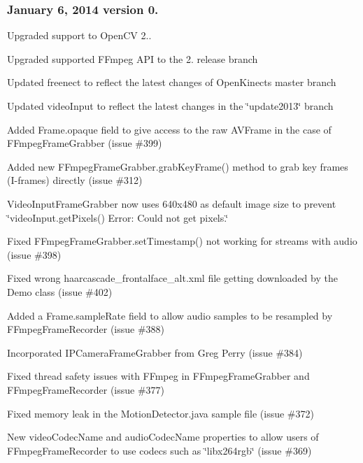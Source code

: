 \subsubsection*{January 6, 2014 version 0.}


\begin{DoxyItemize}
\item Upgraded support to Open\+C\+V 2..
\item Upgraded supported F\+Fmpeg A\+P\+I to the 2. release branch
\item Updated {\ttfamily freenect} to reflect the latest changes of Open\+Kinect\textquotesingle{}s master branch
\item Updated {\ttfamily video\+Input} to reflect the latest changes in the \char`\"{}update2013\char`\"{} branch
\item Added {\ttfamily Frame.\+opaque} field to give access to the raw {\ttfamily A\+V\+Frame} in the case of {\ttfamily F\+Fmpeg\+Frame\+Grabber} (issue \#399)
\item Added new {\ttfamily F\+Fmpeg\+Frame\+Grabber.\+grab\+Key\+Frame()} method to grab key frames (I-\/frames) directly (issue \#312)
\item {\ttfamily Video\+Input\+Frame\+Grabber} now uses 640x480 as default image size to prevent \char`\"{}video\+Input.\+get\+Pixels() Error\+: Could not get pixels.\char`\"{}
\item Fixed {\ttfamily F\+Fmpeg\+Frame\+Grabber.\+set\+Timestamp()} not working for streams with audio (issue \#398)
\item Fixed wrong {\ttfamily haarcascade\+\_\+frontalface\+\_\+alt.\+xml} file getting downloaded by the {\ttfamily Demo} class (issue \#402)
\item Added a {\ttfamily Frame.\+sample\+Rate} field to allow audio samples to be resampled by {\ttfamily F\+Fmpeg\+Frame\+Recorder} (issue \#388)
\item Incorporated {\ttfamily I\+P\+Camera\+Frame\+Grabber} from Greg Perry (issue \#384)
\item Fixed thread safety issues with F\+Fmpeg in {\ttfamily F\+Fmpeg\+Frame\+Grabber} and {\ttfamily F\+Fmpeg\+Frame\+Recorder} (issue \#377)
\item Fixed memory leak in the {\ttfamily Motion\+Detector.\+java} sample file (issue \#372)
\item New {\ttfamily video\+Codec\+Name} and {\ttfamily audio\+Codec\+Name} properties to allow users of {\ttfamily F\+Fmpeg\+Frame\+Recorder} to use codecs such as \char`\"{}libx264rgb\char`\"{} (issue \#369)
\end{DoxyItemize}

